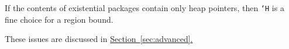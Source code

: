 If the contents of existential packages contain only heap pointers,
then \texttt{`H} is a fine choice for a region bound.

These issues are discussed in
\hyperref[sec:advanced]{Section~\ref{sec:advanced}.}








